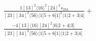 \documentclass[varwidth, border=5pt]{standalone}
\begin{document}
\begin{my}
$\begin{gathered}
\scriptscriptstyle\frac{1[13]^2⟨16⟩^2[24]^2s_{234}}{[23][34]^2⟨56⟩⟨1|5+6|1]^2⟨1|2+3|4]}+\\
\scriptscriptstyle\frac{-4[13]⟨16⟩[24]^2⟨6|2+4|3]}{[23][34]^2⟨56⟩⟨1|5+6|1]⟨1|2+3|4]}\phantom{+}
\end{gathered}$
\end{my}
\end{document}
